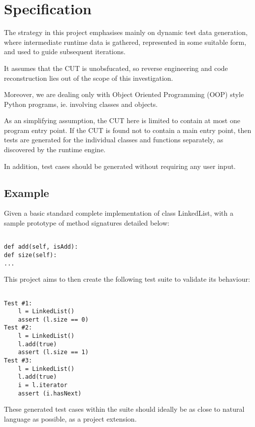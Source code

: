 \documentclass{icldt}
\numberwithin{equation}{section}       %
\begin{document}
\section{Specification}
The strategy in this project emphasises mainly on dynamic test data generation, where intermediate runtime data is gathered, represented in some suitable form, and used to guide subsequent iterations.

It assumes that the CUT is unobsfucated, so reverse engineering and code reconstruction lies out of the scope of this investigation.

Moreover, we are dealing only with Object Oriented Programming (OOP) style Python programs, ie. involving classes and objects.

As an simplifying assumption, the CUT here is limited to contain at most one program entry point. If the CUT is found not to contain a main entry point, then tests are generated for the individual classes and functions separately, as discovered by the runtime engine.

In addition, test cases should be generated without requiring any user input.

\subsection*{Example}
Given a basic standard complete implementation of class \textsf{LinkedList}, with a sample prototype of method signatures detailed below:

\lstset{language=Python}          %
\begin{lstlisting}[frame=single]  % Start your code-block

def add(self, isAdd):
def size(self):
...
\end{lstlisting}

This project aims to then create the following test suite to validate its behaviour:

\begin{lstlisting}[frame=single]  % Start your code-block

Test #1:
	l = LinkedList()
	assert (l.size == 0)
Test #2:
	l = LinkedList()
	l.add(true)
	assert (l.size == 1)
Test #3:
	l = LinkedList()
	l.add(true)
	i = l.iterator
	assert (i.hasNext)
\end{lstlisting}

These generated test cases within the suite should ideally be as close to natural language as possible, as a project extension.
\end{document}
